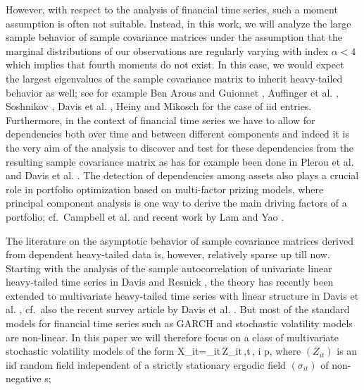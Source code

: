 However, with respect to the analysis of financial time series, such a
moment assumption is often not suitable. Instead, in this work, we
will analyze the large sample behavior of sample covariance matrices
under the assumption that the marginal distributions of our
observations are regularly varying with index $\alpha<4$ which implies
that fourth moments do not exist. In this case, we would expect the
largest eigenvalues of the sample covariance matrix to inherit
heavy-tailed behavior as well; see for example Ben Arous and Guionnet
\cite{benarous:guionnet:2007}, 
Auffinger et al. \cite{auffinger:arous:peche:2009}, Soshnikov
\cite{soshnikov:2004,soshnikov:2006}, Davis et
al. \cite{davis:mikosch:heiny:xie:2015}, Heiny and Mikosch
\cite{heiny:mikosch:2016} for the case of iid entries. Furthermore, in
the context of financial time series we have to allow for dependencies
both over time and between different components and indeed it is the
very aim of the analysis to discover and test for these dependencies
from the resulting sample covariance matrix as has for example been done in  
Plerou et al. \cite{plerou:et:al:2002} and Davis et
al. \cite{davis:pfaffel:stelzer:2014,davis:mikosch:pfaffel:2016}. 
The detection of dependencies among assets also plays a crucial role
in portfolio optimization based on multi-factor prizing models, where
principal component analysis is one way to derive the main driving
factors of a portfolio; cf.\ Campbell et
al. \cite{campbell:lo:macKinlay:1997} and recent work by Lam and Yao
\cite{lam:yao:2012}.
\par
The literature on the asymptotic behavior of sample covariance
matrices derived from dependent heavy-tailed data is, however,
relatively sparse up till now. Starting with the analysis of the
sample autocorrelation of univariate linear heavy-tailed time series
in Davis and Resnick \cite{davis:resnick:1985, davis:resnick:1986},  
the theory has recently been extended to multivariate heavy-tailed time series with linear structure in 
Davis et al. \cite{davis:pfaffel:stelzer:2014,davis:mikosch:pfaffel:2016}, cf.\ also the recent 
survey article by Davis et
al. \cite{davis:mikosch:heiny:xie:2015}. But most of the standard
models for financial time series 
such as GARCH and stochastic volatility models
are non-linear. In this paper we will therefore focus on a class of
multivariate stochastic volatility models of the form
\beam\label{Eq:intro:sv}
X_{it}=\sigma_{it}\,Z_{it}\,,\qquad t\in\bbz\,, \leq i \leq p,
\eeam
where $(Z_{it})$ is an iid random field independent of a strictly
stationary ergodic field $(\sigma_{it})$ of non-negative \rv s;
